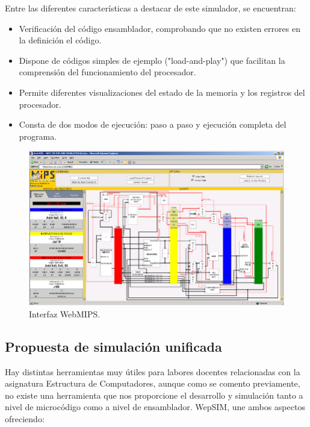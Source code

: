 Entre las diferentes características a destacar de este simulador, se encuentran:

\begin{itemize}
	
\item Verificación del código ensamblador, comprobando que no existen errores en la definición el código.

\item Dispone de códigos simples de ejemplo ("load-and-play") que facilitan la comprensión del funcionamiento del procesador.

\item Permite diferentes visualizaciones del estado de la memoria y los registros del procesador.

\item Consta de dos modos de ejecución: paso a paso y ejecución completa del programa.
	
\end{itemize}

\begin{figure}[htbp]
 	\centering
 	\includegraphics[width=15cm]{figures/webmips_figure}
 	\caption{ Interfaz WebMIPS.}
	\label{fig:webmips_figure}
\end{figure}

\clearpage

\subsection{Propuesta de simulación unificada}
\label{sec:propuesta_simulacion}
Hay distintas herramientas muy útiles para labores docentes relacionadas con la asignatura Estructura de Computadores, aunque como se comento previamente, no existe una herramienta que nos proporcione el desarrollo y simulación tanto a nivel de microcódigo como a nivel de ensamblador. WepSIM, une ambos aspectos ofreciendo:

